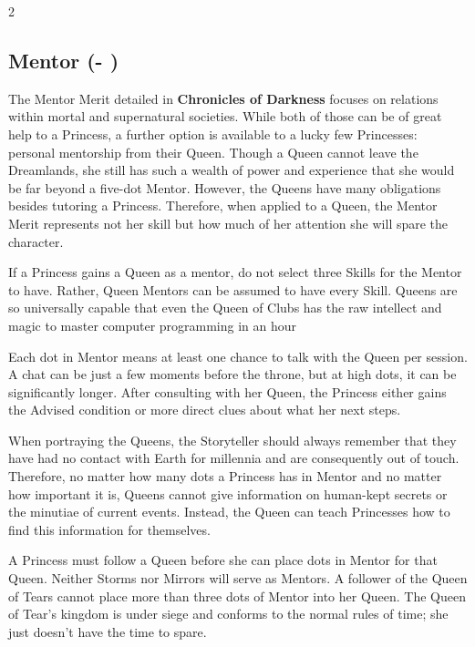 \begin{multicols}{2}
\subsection*{Mentor (\textbullet - \textbullet\textbullet\textbullet\textbullet\textbullet)}

The Mentor Merit detailed in \textbf{Chronicles of Darkness} focuses on relations within mortal and supernatural societies. While both of those can be of great help to a Princess, a further option is available to a lucky few Princesses: personal mentorship from their Queen. Though a Queen cannot leave the Dreamlands, she still has such a wealth of power and experience that she would be far beyond a five-dot Mentor. However, the Queens have many obligations besides tutoring a Princess. Therefore, when applied to a Queen, the Mentor Merit represents not her skill but how much of her attention she will spare the character.

If a Princess gains a Queen as a mentor, do not select three Skills for the Mentor to have. Rather, Queen Mentors can be assumed to have every Skill. Queens are so universally capable that even the Queen of Clubs has the raw intellect and magic to master computer programming in an hour

Each dot in Mentor means at least one chance to talk with the Queen per session. A chat can be just a few moments before the throne, but at high dots, it can be significantly longer. After consulting with her Queen, the Princess either gains the Advised condition or more direct clues about what her next steps.

When portraying the Queens, the Storyteller should always remember that they have had no contact with Earth for millennia and are consequently out of touch. Therefore, no matter how many dots a Princess has in Mentor and no matter how important it is, Queens cannot give information on human-kept secrets or the minutiae of current events. Instead, the Queen can teach Princesses how to find this information for themselves.

A Princess must follow a Queen before she can place dots in Mentor for that Queen. Neither Storms nor Mirrors will serve as Mentors. A follower of the Queen of Tears cannot place more than three dots of Mentor into her Queen. The Queen of Tear's kingdom is under siege and conforms to the normal rules of time; she just doesn't have the time to spare.


\end{multicols}
